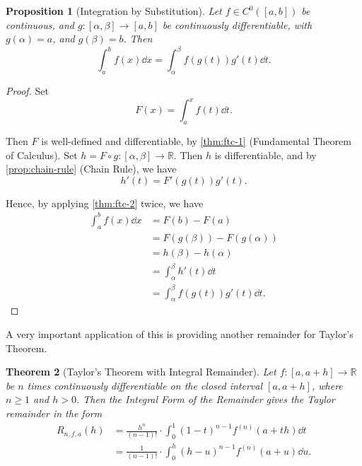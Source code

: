 \documentclass[11pt]{article}
\numberwithin{equation}{section}
\newtheorem{theorem}{Theorem}[section]
\newtheorem{proposition}[theorem]{Proposition}
\theoremstyle{definition}
\theoremstyle{remark}
\newcommand{\pqty}[1]{\left(#1\right)}
\newcommand{\ccintv}[2]{[#1,#2]}
\newcommand{\functiondomain}[3]{#1:#2\to #3}
\newcommand{\RR}{\mathbb R}
\newcommand{\contClass}[1]{C^{#1}}
\begin{document}
\begin{proposition}[Integration by Substitution]\label{analysis-unit-0172}
    \label{prop:integration-by-substitution}%
    Let \(f \in \contClass{0} \pqty{\ccintv{a}{b}}\) be continuous, and \(\functiondomain{g}{\ccintv{\alpha}{\beta}}{\ccintv{a}{b}}\) be continuously differentiable, with \(g\pqty{\alpha} = a\), and \(g\pqty{\beta} = b\). Then
    \[
        \int_{a}^{b} f\pqty{x} \dd{x} = \int_{\alpha}^{\beta} f\pqty{g\pqty{t}} g'\pqty{t} \dd{t}.
    \]
\end{proposition}

\begin{proof}
    Set
    \[
        F\pqty{x} = \int_{a}^{x} f\pqty{t} \dd{t}.
    \]
    
    Then \(F\) is well-defined and differentiable, by \autoref{thm:ftc-1} (Fundamental Theorem of Calculus). Set \(\functiondomain{h = F \circ g}{\ccintv{\alpha}{\beta}}{\RR}\). Then \(h\) is differentiable, and by \autoref{prop:chain-rule} (Chain Rule), we have
    \[
        h'\pqty{t} = F'\pqty{g\pqty{t}} g'\pqty{t}.
    \]

    Hence, by applying \autoref{thm:ftc-2} twice, we have
    \begin{align*}
        \int_{a}^{b} f\pqty{x} \dd{x} &= F\pqty{b} - F\pqty{a} \\
        &= F\pqty{g\pqty{\beta}} - F\pqty{g\pqty{\alpha}} \\
        &= h\pqty{\beta} - h\pqty{\alpha} \\
        &= \int_{\alpha}^{\beta} h'\pqty{t} \dd{t} \\
        &= \int_{\alpha}^{\beta} f\pqty{g\pqty{t}} g'\pqty{t} \dd{t}.
    \end{align*}
\end{proof}

A very important application of this is providing another remainder for Taylor's Theorem.

\begin{theorem}[Taylor's Theorem with Integral Remainder]\label{analysis-unit-0173}
    \label{thm:taylor-thm-integral-remainder}%
    Let \(\functiondomain{f}{\ccintv{a}{a + h}}{\RR}\) be \(n\) times continuously differentiable on the closed interval \(\ccintv{a}{a+h}\), where \(n\ge1\) and \(h>0\). Then the \emph{Integral Form of the Remainder} gives the Taylor remainder in the form
    \begin{align*}
        R_{n, f, a} \pqty{h} &= \frac{h^{n}}{\pqty{n - 1}!} \cdot \int_{0}^{1} \pqty{1 - t}^{n - 1} f^{\pqty{n}} \pqty{a + th} \dd{t} \\
        &= \frac{1}{\pqty{n - 1}!} \cdot \int_{0}^{h} \pqty{h - u}^{n - 1} f^{\pqty{n}} \pqty{a + u} \dd{u}.
    \end{align*}
\end{theorem}
\end{document}

